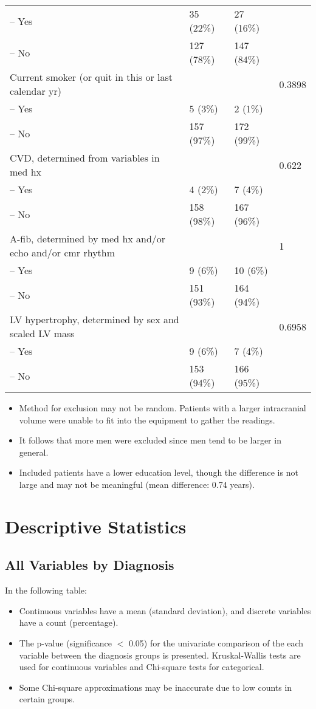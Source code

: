 \documentclass[10pt]{article}\usepackage[]{graphicx}\usepackage[]{color}
\begin{document}
\begin{table}[ht]
\begin{tabular}{llll}
  -- Yes & 35 (22\%) & 27 (16\%) &  \\ 
  -- No & 127 (78\%) & 147 (84\%) &  \\ 
  Current smoker (or quit in this or last calendar yr) &  &  & 0.3898 \\ 
  -- Yes & 5 (3\%) & 2 (1\%) &  \\ 
  -- No & 157 (97\%) & 172 (99\%) &  \\ 
  CVD, determined from variables in med hx &  &  & 0.622 \\ 
  -- Yes & 4 (2\%) & 7 (4\%) &  \\ 
  -- No & 158 (98\%) & 167 (96\%) &  \\ 
  A-fib, determined by med hx and/or echo and/or cmr rhythm &  &  & 1 \\ 
  -- Yes & 9 (6\%) & 10 (6\%) &  \\ 
  -- No & 151 (93\%) & 164 (94\%) &  \\ 
  LV hypertrophy, determined by sex and scaled LV mass &  &  & 0.6958 \\ 
  -- Yes & 9 (6\%) & 7 (4\%) &  \\ 
  -- No & 153 (94\%) & 166 (95\%) &  \\ 
   \bottomrule
\end{tabular}
\end{table}


\begin{itemize}
  \item Method for exclusion may not be random. Patients with a larger intracranial volume were unable to fit into the equipment to gather the readings. 
  \item It follows that more men were excluded since men tend to be larger in general.
  \item Included patients have a lower education level, though the difference is not large and may not be meaningful (mean difference: 0.74 years).
\end{itemize}

\clearpage

\section{Descriptive Statistics}
\subsection{All Variables by Diagnosis}
In the following table:
\begin{itemize}
  \item Continuous variables have a mean (standard deviation), and discrete variables have a count (percentage). 
  \item The p-value (significance $<$ 0.05) for the univariate comparison of the each variable between the diagnosis groups is presented. Kruskal-Wallis tests are used for continuous variables and Chi-square tests for categorical.
  \item Some Chi-square approximations may be inaccurate due to low counts in certain groups.
\end{itemize}
\end{document}
